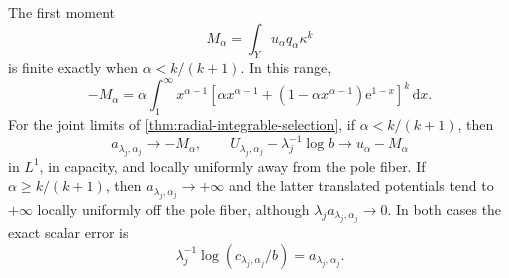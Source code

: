 \begin{proposition}\label{prop:radial-scalar-centering}
The first moment
\[
 M_\alpha=\int_Yu_\alpha q_\alpha\kappa^k
\]
is finite exactly when $\alpha<k/(k+1)$. In this range,
\begin{equation}\label{eq:radial-centering-constant}
 -M_\alpha=\alpha\int_1^\infty x^{\alpha-1}
 \left[\alpha x^{\alpha-1}+(1-\alpha x^{\alpha-1})\mathrm e^{1-x}\right]^k\,\mathrm dx.
\end{equation}
For the joint limits of \cref{thm:radial-integrable-selection}, if $\alpha<k/(k+1)$, then
\[
 a_{\lambda_j,\alpha_j}\to-M_\alpha,\qquad
 U_{\lambda_j,\alpha_j}-\lambda_j^{-1}\log b
       \to u_\alpha-M_\alpha
\]
in $L^1$, in capacity, and locally uniformly away from the pole fiber. If $\alpha\geq k/(k+1)$, then $a_{\lambda_j,\alpha_j}\to+\infty$ and the latter translated potentials tend to $+\infty$ locally uniformly off the pole fiber, although $\lambda_ja_{\lambda_j,\alpha_j}\to0$. In both cases the exact scalar error is
\[
 \lambda_j^{-1}\log(c_{\lambda_j,\alpha_j}/b)
       =a_{\lambda_j,\alpha_j}.
\]
\end{proposition}
